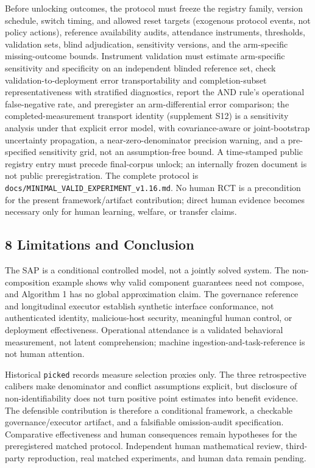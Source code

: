 \documentclass[
  11pt]{article}
\begin{document}
Before unlocking outcomes, the protocol must freeze the registry family,
version schedule, switch timing, and allowed reset targets (exogenous
protocol events, not policy actions), reference availability audits,
attendance instruments, thresholds, validation sets, blind adjudication,
sensitivity versions, and the arm-specific missing-outcome bounds.
Instrument validation must estimate arm-specific sensitivity and
specificity on an independent blinded reference set, check
validation-to-deployment error transportability and completion-subset
representativeness with stratified diagnostics, report the AND rule's
operational false-negative rate, and preregister an arm-differential
error comparison; the completed-measurement transport identity
(supplement S12) is a sensitivity analysis under that explicit error
model, with covariance-aware or joint-bootstrap uncertainty propagation,
a near-zero-denominator precision warning, and a pre-specified
sensitivity grid, not an assumption-free bound. A time-stamped public
registry entry must precede final-corpus unlock; an internally frozen
document is not public preregistration. The complete protocol is
\texttt{docs/MINIMAL\_VALID\_EXPERIMENT\_v1.16.md}. No human RCT is a
precondition for the present framework/artifact contribution; direct
human evidence becomes necessary only for human learning, welfare, or
transfer claims.

\subsection{8 Limitations and
Conclusion}\label{limitations-and-conclusion}

The SAP is a conditional controlled model, not a jointly solved system.
The non-composition example shows why valid component guarantees need
not compose, and Algorithm 1 has no global approximation claim. The
governance reference and longitudinal executor establish synthetic
interface conformance, not authenticated identity, malicious-host
security, meaningful human control, or deployment effectiveness.
Operational attendance is a validated behavioral measurement, not latent
comprehension; machine ingestion-and-task-reference is not human
attention.

Historical \texttt{picked} records measure selection proxies only. The
three retrospective calibers make denominator and conflict assumptions
explicit, but disclosure of non-identifiability does not turn positive
point estimates into benefit evidence. The defensible contribution is
therefore a conditional framework, a checkable governance/executor
artifact, and a falsifiable omission-audit specification. Comparative
effectiveness and human consequences remain hypotheses for the
preregistered matched protocol. Independent human mathematical review,
third-party reproduction, real matched experiments, and human data
remain pending.
\end{document}
